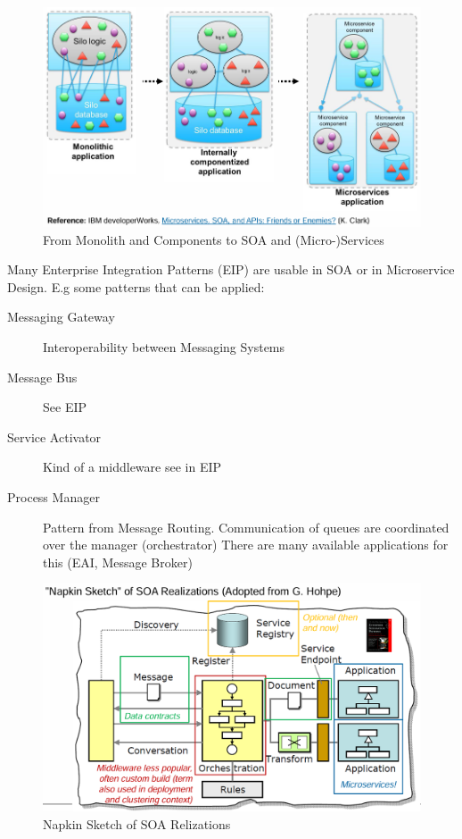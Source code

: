\documentclass[../Main.tex]{subfiles}
\begin{document}

\begin{figure}[H]
    \centering
    \includegraphics[width=0.75\linewidth]{Images/ibm-microservices.png}
    \caption{From Monolith and Components to SOA and (Micro-)Services}
\end{figure}

Many Enterprise Integration Patterns (EIP) are usable in SOA or in Microservice Design.
E.g some patterns that can be applied:
\begin{description}
    \item[Messaging Gateway] Interoperability between Messaging Systems
    \item[Message Bus] See EIP
    \item[Service Activator] Kind of a middleware see in EIP
    \item[Process Manager] Pattern from Message Routing. Communication of queues are coordinated over the manager (orchestrator)
    There are many available applications for this (EAI, Message Broker)
\end{description}

\begin{figure}[H]
    \centering
    \includegraphics[width=1\linewidth]{Images/napkin-soa.png}
    \caption{Napkin Sketch of SOA Relizations}
\end{figure}
\end{document}
